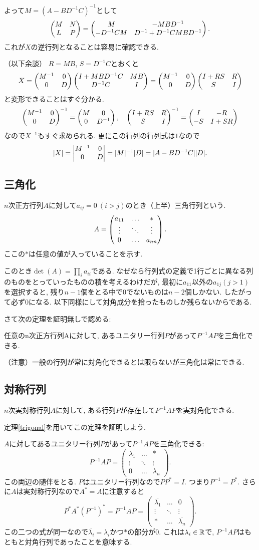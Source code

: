 よって$M=(A-BD^{-1}C)^{-1}$として
$$\begin{pmatrix} M & N \\ L & P \end{pmatrix}=\begin{pmatrix} M & -MBD^{-1} \\ -D^{-1}CM & D^{-1}+D^{-1}CMBD^{-1} \end{pmatrix}.$$
これが$X$の逆行列となることは容易に確認できる.

（以下余談）
$R=MB$, $S=D^{-1}C$とおくと
$$X=\begin{pmatrix} M^{-1} & 0 \\ 0 & D \end{pmatrix} \begin{pmatrix} I+MBD^{-1}C & MB \\ D^{-1}C & I \end{pmatrix}=\begin{pmatrix} M^{-1} & 0 \\ 0 & D \end{pmatrix}\begin{pmatrix} I+RS & R \\ S & I \end{pmatrix}$$
と変形できることはすぐ分かる.
$$
\begin{pmatrix} M^{-1} & 0 \\ 0 & D \end{pmatrix}^{-1}=\begin{pmatrix} M & 0 \\ 0 & D^{-1} \end{pmatrix}
,\quad
\begin{pmatrix} I+RS & R \\ S & I \end{pmatrix}^{-1}=\begin{pmatrix} I & -R \\ -S & I+SR \end{pmatrix}
$$
なので$X^{-1}$もすぐ求められる. 更にこの行列の行列式は$1$なので
$$
|X|=\begin{vmatrix} M^{-1} & 0 \\ 0 & D \end{vmatrix} = |M|^{-1}|D|=|A-BD^{-1}C||D|.
$$
\vspace{0pt}

\subsection{三角化}

$n$次正方行列$A$に対して$a_{ij} = 0\ (i>j)$のとき（上半）三角行列という.
$$A=\begin{pmatrix} a_{11} & \ldots & * \\ \vdots & \ddots & \vdots \\ 0 & \ldots & a_{nn} \end{pmatrix}.$$
ここの$*$は任意の値が入っていることを示す.

このとき$\det(A)=\prod_i a_{ii}$である. なぜなら行列式の定義で1行ごとに異なる列のものをとっていったものの積を考えるわけだが,
最初に$a_{11}$以外の$a_{1j} (j>1)$を選択すると, 残り$n-1$個をとる中で$0$でないものは$n-2$個しかない. したがって必ず$0$になる.
以下同様にして対角成分を拾ったものしか残らないからである.

さて次の定理を証明無しで認める:
\begin{thm}\label{trigonal}
任意のn次正方行列Aに対して, あるユニタリー行列$P$があって$P^{-1}AP$を三角化できる.
\end{thm}
（注意）一般の行列が常に対角化できるとは限らないが三角化は常にできる.

\subsection{対称行列}

\begin{thm}
$n$次実対称行列$A$に対して, ある行列$P$が存在して$P^{-1}AP$を実対角化できる.
\end{thm}

定理\ref{trigonal}を用いてこの定理を証明しよう.

$A$に対してあるユニタリー行列$P$があって$P^{-1}AP$を三角化できる:
$$P^{-1}AP=
\begin{pmatrix}
  \lambda_1 & \ldots & * \\
  \vdots & \ddots & \vdots \\
  0 & \ldots & \lambda_n
\end{pmatrix}.
$$
この両辺の随伴をとる. $P$はユニタリー行列なので$PP^*=I$. つまり$P^{-1} = P^*$.
さらに$A$は実対称行列なので$A^*=A$に注意すると
$$P^*A^*(P^{-1})^*=P^{-1}AP=
\begin{pmatrix}
  \overline{\lambda_1} & \ldots & 0 \\
  \vdots & \ddots & \vdots \\
  * & \ldots & \overline{\lambda_n}
\end{pmatrix}.
$$
この二つの式が同一なので$\overline{\lambda_i}=\lambda_i$かつ$*$の部分が$0$.
これは$\lambda_i \in \mathbb{R}$で, $P^{-1}AP$はもともと対角行列であったことを意味する.

